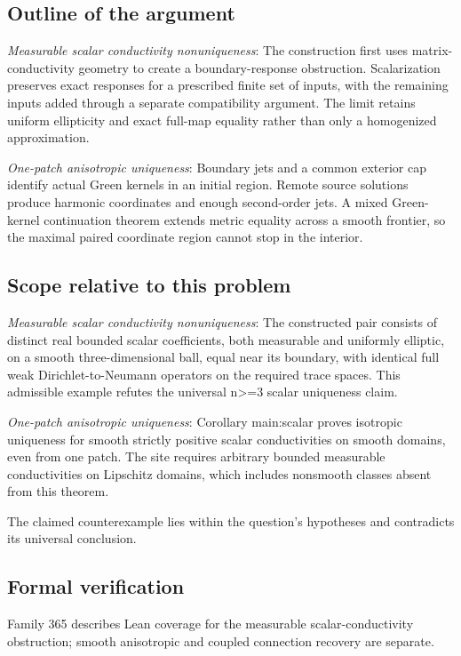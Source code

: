 \documentclass[11pt]{article}
\begin{document}
\subsection{Outline of the argument}
\textit{Measurable scalar conductivity nonuniqueness}: The construction first uses matrix-conductivity geometry to create a boundary-response obstruction. Scalarization preserves exact responses for a prescribed finite set of inputs, with the remaining inputs added through a separate compatibility argument. The limit retains uniform ellipticity and exact full-map equality rather than only a homogenized approximation.

\textit{One-patch anisotropic uniqueness}: Boundary jets and a common exterior cap identify actual Green kernels in an initial region. Remote source solutions produce harmonic coordinates and enough second-order jets. A mixed Green-kernel continuation theorem extends metric equality across a smooth frontier, so the maximal paired coordinate region cannot stop in the interior.

\subsection{Scope relative to this problem}
\textit{Measurable scalar conductivity nonuniqueness}: The constructed pair consists of distinct real bounded scalar coefficients, both measurable and uniformly elliptic, on a smooth three-dimensional ball, equal near its boundary, with identical full weak Dirichlet-to-Neumann operators on the required trace spaces. This admissible example refutes the universal n>=3 scalar uniqueness claim.

\textit{One-patch anisotropic uniqueness}: Corollary main:scalar proves isotropic uniqueness for smooth strictly positive scalar conductivities on smooth domains, even from one patch. The site requires arbitrary bounded measurable conductivities on Lipschitz domains, which includes nonsmooth classes absent from this theorem.

The claimed counterexample lies within the question’s hypotheses and contradicts its universal conclusion.

\subsection{Formal verification}
Family 365 describes Lean coverage for the measurable scalar-conductivity obstruction; smooth anisotropic and coupled connection recovery are separate.
\end{document}
